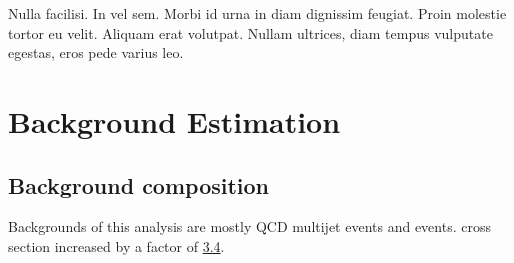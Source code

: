 \begin{savequote}[75mm]
Nulla facilisi. In vel sem. Morbi id urna in diam dignissim feugiat. Proin molestie tortor eu velit. Aliquam erat volutpat. Nullam ultrices, diam tempus vulputate egestas, eros pede varius leo.
\end{savequote}

\chapter{Background Estimation}

\section{Background composition}
Backgrounds of this analysis are mostly QCD multijet events and \ttbar events. \ttbar cross section increased by a factor of \href{https://cds.cern.ch/record/2227057/files/STDM-2016-02-02.pdf}{3.4}.


